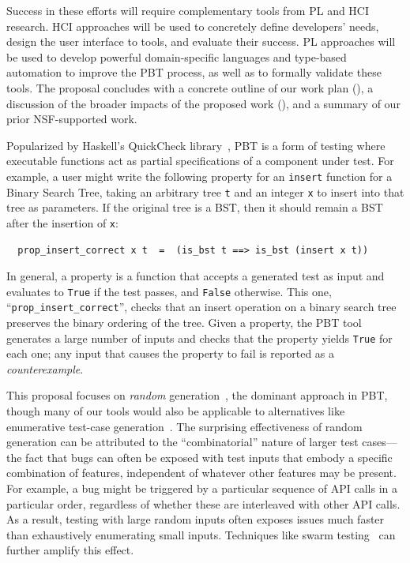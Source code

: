 Success in these efforts will require complementary tools from PL
and HCI research. HCI approaches will be used to concretely define developers' needs,
design the user interface to tools, and evaluate their success. PL approaches
will be used to develop powerful domain-specific languages and type-based automation
to improve the PBT process, as well as to formally validate these
tools. The proposal concludes with a concrete outline of our work plan
(), a discussion of the broader impacts of the
proposed work (), and a summary of our
prior NSF-supported work.

%
Popularized by Haskell's QuickCheck library~\cite{hughes2007quickcheck},
PBT is a form of testing where
executable functions act as partial
specifications of a component under test. For example, a user might
write the following property for an \lstinline{insert}
function for a Binary Search Tree, taking an arbitrary tree \texttt{t}
and an integer
\texttt{x} to insert into that tree as parameters. If the original tree
is a BST, then it should remain
a BST after the insertion of \texttt{x}:
\begin{lstlisting}
  prop_insert_correct x t  =  (is_bst t ==> is_bst (insert x t))
\end{lstlisting}
In general, a property is a function that
accepts a generated
test as input and evaluates to \lstinline{True} if the test passes, and
\lstinline{False} otherwise.  This one, ``\verb|prop_insert_correct|'',
checks that an insert operation on a binary search tree preserves the
binary ordering of the tree.
Given a property, the PBT tool generates a
large number of inputs and
checks that the property yields \lstinline{True} for each one; any input
that causes the property to fail is reported as a {\em counterexample}.

This proposal focuses on {\em random}
generation~\cite{hamlet1994random}, the dominant approach in PBT,
though many of our tools would
also be applicable to alternatives like enumerative test-case
generation~\cite{DBLP:conf/haskell/RuncimanNL08, leancheck}.
The surprising effectiveness of random generation can be attributed to the
``combinatorial'' nature of larger test cases---the fact that bugs can often be
exposed with test inputs that embody a specific combination of features,
independent of whatever other features may be present. For example,
a bug might be triggered by a particular sequence of API calls in a
particular order,
regardless of whether these are
interleaved with other API calls. As a result, testing with large random
inputs often exposes issues much faster than exhaustively enumerating
small inputs.  Techniques like swarm testing~\cite{groce2012swarm} can
further amplify this effect.

